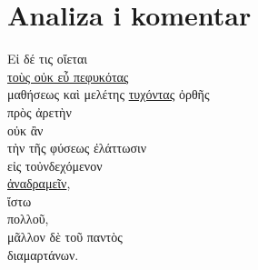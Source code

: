 \section*{Analiza i komentar}


{\large
\begin{greek}
\noindent Εἰ δέ τις οἴεται \\
\tabto{2em} \underline{τοὺς οὐκ εὖ πεφυκότας} \\
\tabto{4em} μαθήσεως καὶ μελέτης \underline{τυχόντας} ὀρθῆς \\
\tabto{6em} πρὸς ἀρετὴν \\
\tabto{4em} οὐκ ἂν \\
\tabto{6em} τὴν τῆς φύσεως ἐλάττωσιν \\
\tabto{8em} εἰς τοὐνδεχόμενον \\
\tabto{6em} \underline{ἀναδραμεῖν}, \\
ἴστω \\
\tabto{2em} πολλοῦ, \\
\tabto{2em} μᾶλλον δὲ τοῦ παντὸς \\
\tabto{2em} διαμαρτάνων.\\

\end{greek}
}

